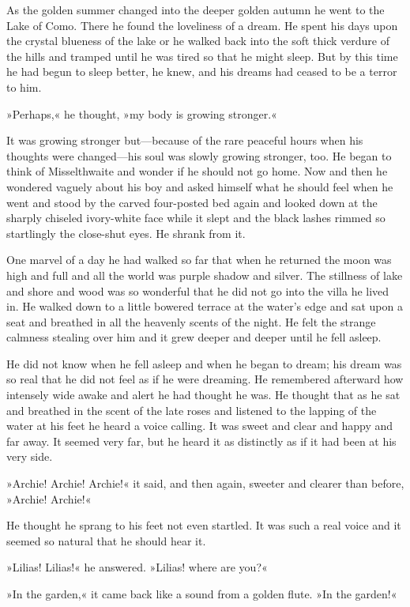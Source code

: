 As the golden summer changed into the deeper golden autumn he went to the Lake of Como. There he found the loveliness of a dream. He spent his days upon the crystal blueness of the lake or he walked back into the soft thick verdure of the hills and tramped until he was tired so that he might sleep. But by this time he had begun to sleep better, he knew, and his dreams had ceased to be a terror to him.

»Perhaps,« he thought, »my body is growing stronger.«

It was growing stronger but—because of the rare peaceful hours when his thoughts were changed—his soul was slowly growing stronger, too. He began to think of Misselthwaite and wonder if he should not go home. Now and then he wondered vaguely about his boy and asked himself what he should feel when he went and stood by the carved four-posted bed again and looked down at the sharply chiseled ivory-white face while it slept and the black lashes rimmed so startlingly the close-shut eyes. He shrank from it.

One marvel of a day he had walked so far that when he returned the moon was high and full and all the world was purple shadow and silver. The stillness of lake and shore and wood was so wonderful that he did not go into the villa he lived in. He walked down to a little bowered terrace at the water's edge and sat upon a seat and breathed in all the heavenly scents of the night. He felt the strange calmness stealing over him and it grew deeper and deeper until he fell asleep.

He did not know when he fell asleep and when he began to dream; his dream was so real that he did not feel as if he were dreaming. He remembered afterward how intensely wide awake and alert he had thought he was. He thought that as he sat and breathed in the scent of the late roses and listened to the lapping of the water at his feet he heard a voice calling. It was sweet and clear and happy and far away. It seemed very far, but he heard it as distinctly as if it had been at his very side.

»Archie! Archie! Archie!« it said, and then again, sweeter and clearer than before, »Archie! Archie!«

He thought he sprang to his feet not even startled. It was such a real voice and it seemed so natural that he should hear it.

»Lilias! Lilias!« he answered. »Lilias! where are you?«

»In the garden,« it came back like a sound from a golden flute. »In the garden!«


